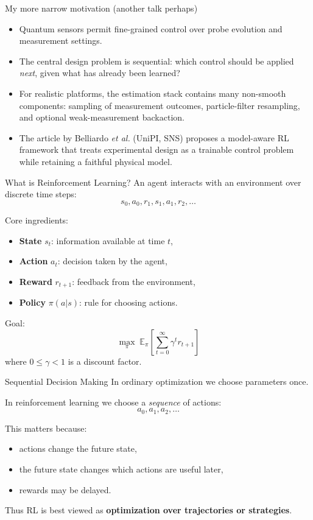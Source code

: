 \documentclass[aspectratio=169]{beamer}
\begin{document}
\begin{frame}{My more narrow motivation (another talk perhaps)}
\begin{itemize}
  \item Quantum sensors permit fine-grained control over probe evolution and measurement settings.
  \item The central design problem is sequential: which control should be applied \emph{next}, given what has already been learned?
  \item For realistic platforms, the estimation stack contains many non-smooth components: sampling of measurement outcomes, particle-filter resampling, and optional weak-measurement backaction.
  \item The article by Belliardo {\em et al.} (UniPI, SNS)  proposes a \alert{model-aware RL} framework that treats experimental design as a trainable control problem while retaining a faithful physical model.
\end{itemize}
\end{frame}


\begin{frame}{What is Reinforcement Learning?}
  An agent interacts with an environment over discrete time steps:
  \[
  s_0,a_0,r_1,s_1,a_1,r_2,\dots
  \]

  Core ingredients:
  \begin{itemize}
  \item \textbf{State} $s_t$: information available at time $t$,
  \item \textbf{Action} $a_t$: decision taken by the agent,
  \item \textbf{Reward} $r_{t+1}$: feedback from the environment,
  \item \textbf{Policy} $\pi(a|s)$: rule for choosing actions.
  \end{itemize}

  Goal:
  \[
  \max_\pi \; \mathbb{E}_\pi\!\left[\sum_{t=0}^{\infty}\gamma^t r_{t+1}\right]
  \]
  where $0\le \gamma <1$ is a discount factor.
\end{frame}

\begin{frame}{Sequential Decision Making}
  In ordinary optimization we choose parameters once.

  In reinforcement learning we choose a \emph{sequence} of actions:
  \[
  a_0,a_1,a_2,\dots
  \]

  This matters because:
  \begin{itemize}
  \item actions change the future state,
  \item the future state changes which actions are useful later,
  \item rewards may be delayed.
  \end{itemize}

  Thus RL is best viewed as \textbf{optimization over trajectories or strategies}.
\end{frame}
\end{document}
